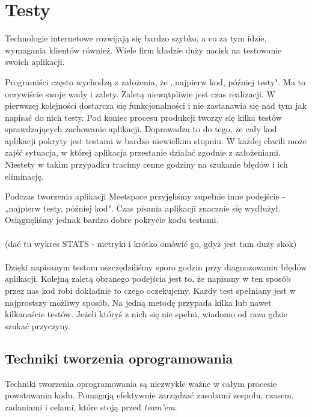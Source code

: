 \section{Testy}
  \label{testy}
  Technologie internetowe rozwijają się bardzo szybko, a co za tym idzie, wymagania klientów również. Wiele firm kładzie duży nacisk na testowanie swoich aplikacji.

  Programiści często wychodzą z założenia, że ,,najpierw kod, później testy". Ma to oczywiście swoje wady i zalety. Zaletą niewątpliwie jest czas realizacji. W pierwszej kolejności dostarcza się funkcjonalności i nie zastanawia się nad tym jak napisać do nich testy. Pod koniec procesu produkcji tworzy się kilka testów sprawdzających zachowanie aplikacji. Doprowadza to do tego, że cały kod aplikacji pokryty jest testami w bardzo niewielkim stopniu. W każdej chwili może zajść sytuacja, w której aplikacja przestanie działać zgodnie z założeniami. Niestety w takim przypadku tracimy cenne godziny na szukanie błędów i ich eliminację.

  Podczas tworzenia aplikacji Meetspace przyjęliśmy zupełnie inne podejście - „najpierw testy, później kod". Czas pisania aplikacji znacznie się wydłużył. Osiągnęliśmy jednak bardzo dobre pokrycie kodu testami. \\ \\
    (dać tu wykres STATS - metryki i krótko omówić go, gdyż jest tam duży skok) \\ \\
  Dzięki napisanym testom oszczędziliśmy sporo godzin przy diagnozowaniu błędów aplikacji. Kolejną zaletą obranego podejścia jest to, że napisany w ten sposób przez nas kod robi dokładnie to czego oczekujemy. Każdy test spełniany jest w najprostszy możliwy sposób. Na jedną metodę przypada kilka lub nawet kilkanaście testów. Jeżeli któryś z nich się nie spełni, wiadomo od razu gdzie szukać przyczyny.

  \subsection{Techniki tworzenia oprogramowania}
    Techniki tworzenia oprogramowania są niezwykle ważne w całym procesie powstawania kodu. Pomagają efektywnie zarządzać zasobami zespołu, czasem, zadaniami i celami, które stoją przed \emph{team'em}.

